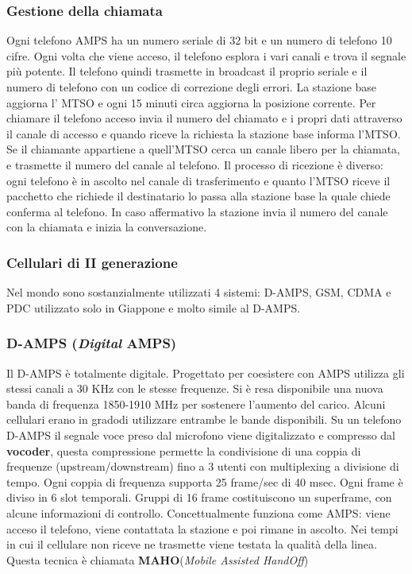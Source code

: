 \subsubsection*{Gestione della chiamata}

Ogni telefono AMPS ha un numero seriale di 32 bit e un numero di telefono 10 cifre. Ogni volta che viene acceso, il telefono esplora i vari canali e trova il segnale più potente. Il telefono quindi trasmette in broadcast il proprio seriale e il numero di telefono con un codice di correzione degli errori. La stazione base aggiorna l' MTSO e ogni 15 minuti circa aggiorna la posizione corrente. Per chiamare il telefono acceso invia il numero del chiamato e i propri dati attraverso il canale di accesso e quando riceve la richiesta la stazione base informa l'MTSO. Se il chiamante appartiene a quell'MTSO cerca un canale libero per la chiamata, e trasmette il numero del canale al telefono. Il processo di ricezione è diverso: ogni telefono è in ascolto nel canale di trasferimento e quanto l'MTSO riceve il pacchetto che richiede il destinatario lo passa alla stazione base la quale chiede conferma al telefono. In caso affermativo la stazione invia il numero del canale con la chiamata e inizia la conversazione.

\subsubsection{Cellulari di II generazione}

Nel mondo sono sostanzialmente utilizzati  4 sistemi: D-AMPS, GSM, CDMA e PDC utilizzato solo in Giappone e molto simile al D-AMPS.

\subsubsection*{D-AMPS (\textit{Digital} AMPS)}

Il D-AMPS è totalmente digitale. Progettato per coesistere con AMPS utilizza gli stessi canali a 30 KHz con le stesse frequenze. Si è resa disponibile una nuova banda di frequenza 1850-1910 MHz per sostenere l'aumento del carico. Alcuni cellulari erano in gradodi utilizzare entrambe le bande disponibili. Su un telefono D-AMPS il segnale voce preso dal microfono viene digitalizzato e compresso dal \textbf{vocoder}, questa compressione permette la condivisione di una coppia di frequenze (upstream/downstream) fino a 3 utenti con multiplexing a divisione di tempo. Ogni coppia di frequenza supporta 25 frame/sec di 40 msec. Ogni frame è diviso in 6 slot temporali. Gruppi di 16 frame costituiscono un superframe, con alcune informazioni di controllo. Concettualmente funziona come AMPS: viene acceso il telefono, viene contattata la stazione e poi rimane in ascolto.
Nei tempi in cui il cellulare non riceve ne trasmette viene testata la qualità della linea. Questa tecnica è chiamata \textbf{MAHO}(\textit{Mobile Assisted HandOff})

